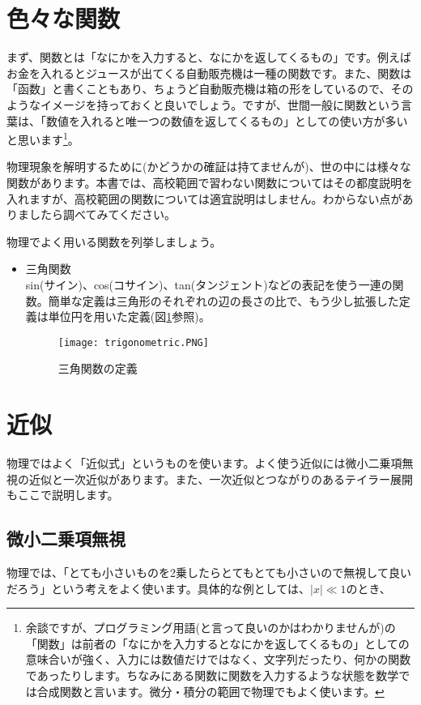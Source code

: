 \section{色々な関数}
\label{function}
まず、関数とは「なにかを入力すると、なにかを返してくるもの」です。例えばお金を入れるとジュースが出てくる自動販売機は一種の関数です。また、関数は「函数」と書くこともあり、ちょうど自動販売機は箱の形をしているので、そのようなイメージを持っておくと良いでしょう。ですが、世間一般に関数という言葉は、「数値を入れると唯一つの数値を返してくるもの」としての使い方が多いと思います\footnote{余談ですが、プログラミング用語(と言って良いのかはわかりませんが)の「関数」は前者の「なにかを入力するとなにかを返してくるもの」としての意味合いが強く、入力には数値だけではなく、文字列だったり、何かの関数であったりします。ちなみにある関数に関数を入力するような状態を数学では合成関数と言います。微分・積分の範囲で物理でもよく使います。}。

物理現象を解明するために(かどうかの確証は持てませんが)、世の中には様々な関数があります。本書では、高校範囲で習わない関数についてはその都度説明を入れますが、高校範囲の関数については適宜説明はしません。わからない点がありましたら調べてみてください。

物理でよく用いる関数を列挙しましょう。

\begin{itemize}
    \item 三角関数\\
        sin(サイン)、cos(コサイン)、tan(タンジェント)などの表記を使う一連の関数。簡単な定義は三角形のそれぞれの辺の長さの比で、もう少し拡張した定義は単位円を用いた定義(図\ref{fig:trigonometric}参照)。
        \begin{figure}[!ht]
            \centering
            \texttt{[image: trigonometric.PNG]}
            \caption{三角関数の定義}
            \label{fig:trigonometric}
        \end{figure}
        
\end{itemize}
\fi


\section{近似}
物理ではよく「近似式」というものを使います。よく使う近似には微小二乗項無視の近似と一次近似があります。また、一次近似とつながりのあるテイラー展開もここで説明します。


\subsection{微小二乗項無視}
物理では、「とても小さいものを2乗したらとてもとても小さいので無視して良いだろう」という考えをよく使います。具体的な例としては、$|x|\ll1$のとき、

